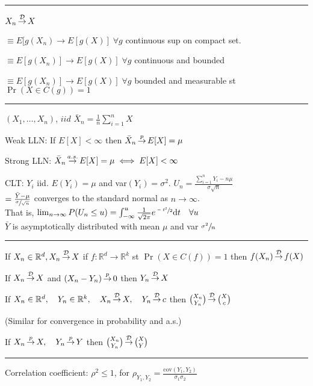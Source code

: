 \documentclass[notitlepage,10pt,twocolumn]{article}
\newcommand\cali[1]{\ensuremath{\mathcal{#1}}}
\newcommand\reals{\ensuremath{\mathbb{R}}}
\newcommand\sumn{\sum_{i=1}^n}
\newcommand\Xsamp{\ensuremath{(X_1,\dots,X_n)}}
\renewcommand\top{\,{\buildrel p \over \to}\,}
\newcommand\tod{\,{\buildrel \cali{D} \over \to}\,}
\newcommand\toas{\,{\buildrel a.s. \over \to}\,}
\begin{document}
\vspace{.15cm} \hrule \vspace{.15cm}

$X_n \tod X$

$\equiv E[g(X_n) \to E[g(X)]\; \forall g$ continuous sup on compact set.

$\equiv E[g(X_n)] \to E[g(X)]\; \forall g$ continuous and bounded

$\equiv E[g(X_n)] \to E[g(X)]\; \forall g$ bounded and measurable st $\Pr(X\in C(g)) = 1$

\vspace{.15cm} \hrule \vspace{.15cm}

$\Xsamp$, $iid$ \quad \quad $\bar{X}_n = \frac{1}{n} \sumn X$

Weak LLN: If $E[X] < \infty$ then $\bar{X}_n \top E[X]=\mu$

Strong LLN: $\bar{X}_n \toas E[X]=\mu \iff E[X] < \infty$

CLT: $Y_i$ iid. $E(Y_i)=\mu$ and var$(Y_i) = \sigma^2$. $U_n = \frac{\sum_{i=1}^n Y_i -n\mu}{\sigma \sqrt{n}}$\\ $ = \frac{\bar{Y} - \mu}{\sfrac{\sigma}{\sqrt{n}}}$ converges to the standard normal as $n\to \infty$. \\
	That is, $\lim_{n\to\infty} P(U_n \le u) = \int_{-\infty}^u \frac{1}{\sqrt{2\pi}}e^{\sfrac{-t^2}{2}}\textrm{d}t\quad \forall u$\\
	$\bar{Y}$ is asymptotically distributed with mean $\mu$ and var $\sfrac{\sigma^2}{n}$

\vspace{.15cm} \hrule \vspace{.15cm}

If $X_n \in \reals^d, X_n \tod X$ if $f:\reals^d \to \reals^k$ st $\Pr(X\in C(f)) =1$ then $f(X_n)\tod f(X)$

If $X_n \tod X$ and $(X_n - Y_n) \top 0$ then $Y_n \tod X$

If $X_n \in \reals^d ,\quad Y_n \in \reals^k ,\quad X_n \tod X ,\quad Y_n \tod c$ then $\binom{X_n}{Y_n} \tod \binom{X}{c}$

(Similar for convergence in probability and a.s.)

If $X_n \top X ,\quad Y_n \top Y$ then $\binom{X_n}{Y_n} \tod \binom{X}{Y}$
\vspace{.15cm} \hrule \vspace{.15cm}

Correlation coefficient: $\rho^2 \le 1$, for $\rho_{Y_1,Y_2} = \frac{\text{cov}(Y_1,Y_2)}{\sigma_1 \sigma_2}$
\end{document}
